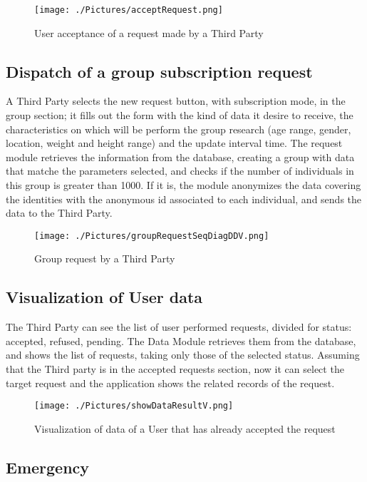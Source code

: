 \begin{figure}[H]
    \centering
    \texttt{[image: ./Pictures/acceptRequest.png]}
    \caption{User acceptance of a request made by a Third Party}
\end{figure}

\subsection{Dispatch of a group subscription request }
A Third Party selects the new request button, with subscription mode, in the group section; it fills out the form with the kind of data it desire to receive, the characteristics on which will be perform the group research (age range, gender, location, weight and height range) and the update interval time. The request module retrieves the information from the database, creating a group with data that matche the parameters selected, and checks if the number of individuals in this group is greater than 1000. If it is, the module anonymizes the data covering the identities with the anonymous id associated to each individual, and sends the data to the Third Party.

\begin{figure}[H]
    \centering
    \texttt{[image: ./Pictures/groupRequestSeqDiagDDV.png]}
    \caption{Group request by a Third Party}
\end{figure}

\subsection{Visualization of User data  }
The Third Party can see the list of user performed requests, divided for status: accepted, refused, pending. The Data Module retrieves them from the database, and shows the list of requests, taking only those of the selected status. Assuming that the Third party is in the accepted requests section, now it can select the target request and the application shows the related records of the request.
\begin{figure}[H]
    \centering
    \texttt{[image: ./Pictures/showDataResultV.png]}
    \caption{Visualization of data of a User that has already accepted the request}
\end{figure}

\subsection{Emergency}


